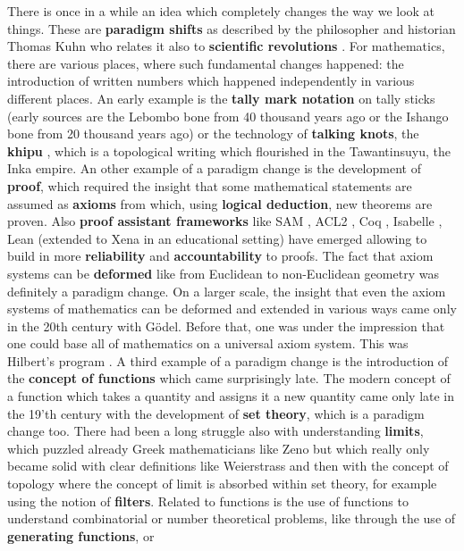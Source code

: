 \documentclass[12pt]{amsart}
\newcounter{example}    \def\example#1{ \item \fontsize{12}{15} \selectfont #1 \fontsize{12}{15} \selectfont }
\begin{document}
There is once in a while an idea which completely changes the way we look at things. 
These are {\bf paradigm shifts} as described by the philosopher and historian Thomas Kuhn
who relates it also to {\bf scientific revolutions} \cite{KuhnScientificRevolutions}. 
For mathematics, there are various places, where such fundamental changes happened:
the introduction of written numbers which happened independently in various different
places. An early example is the {\bf tally mark notation} on tally sticks 
(early sources are the Lebombo bone from 40 thousand years ago or the Ishango bone 
from 20 thousand years ago) or the technology of {\bf talking knots}, the {\bf khipu} 
\cite{UrtonInkaHistoryKnots}, which is a topological writing which flourished in the
Tawantinsuyu, the Inka empire. 
An other example of a paradigm change is the development of {\bf proof}, which required
the insight that some mathematical statements are assumed as {\bf axioms} from which, using 
{\bf logical deduction}, new theorems are proven. Also {\bf proof assistant frameworks} like
SAM \cite{Huet1973},
ACL2 \cite{ACL2CaseStudies}, Coq \cite{BertotCasteran},
Isabelle \cite{Isabelle2002}, Lean \cite{Hales2018} (extended to Xena in an educational setting)
have emerged allowing to build in more {\bf reliability} and {\bf accountability} to proofs. 
The fact that axiom systems can be {\bf deformed} like from Euclidean to non-Euclidean geometry was definitely 
a paradigm change. On a larger scale, the insight that even the axiom systems of 
mathematics can be deformed and extended in various ways came only in the 20th century with G\"odel. 
Before that, one was under the impression that one could  base all of mathematics on a universal axiom system.
This was Hilbert's program \cite{Zach2007}. 
A third example of a paradigm change is the introduction of the {\bf concept of functions}
which came surprisingly late. The modern concept of a function which takes a quantity
and assigns it a new quantity came only late in the 19'th century with the development
of {\bf set theory}, which is a paradigm change too. There had been a long struggle
also with understanding {\bf limits}, which puzzled already Greek mathematicians like Zeno
but which really only became solid with clear definitions like Weierstrass and then with
the concept of topology where the concept of limit is absorbed within set theory, for example
using the notion of {\bf filters}. Related to functions is the use of functions to understand combinatorial
or number theoretical problems, like through the use of {\bf generating functions}, or 
\end{document}
